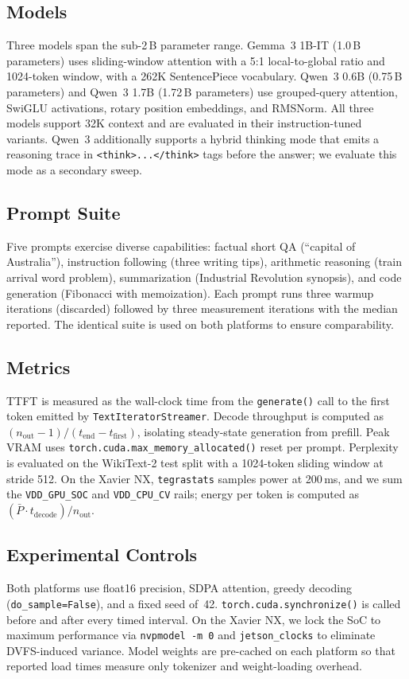 \documentclass[conference]{IEEEtran}
\begin{document}
\subsection{Models}
Three models span the sub-2\,B parameter range. Gemma~3 1B-IT (1.0\,B parameters) uses sliding-window attention with a 5:1 local-to-global ratio and 1024-token window, with a 262K SentencePiece vocabulary. Qwen~3 0.6B (0.75\,B parameters) and Qwen~3 1.7B (1.72\,B parameters) use grouped-query attention, SwiGLU activations, rotary position embeddings, and RMSNorm. All three models support 32K context and are evaluated in their instruction-tuned variants. Qwen~3 additionally supports a hybrid thinking mode that emits a reasoning trace in \texttt{<think>...</think>} tags before the answer; we evaluate this mode as a secondary sweep.

\subsection{Prompt Suite}
Five prompts exercise diverse capabilities: factual short QA (``capital of Australia''), instruction following (three writing tips), arithmetic reasoning (train arrival word problem), summarization (Industrial Revolution synopsis), and code generation (Fibonacci with memoization). Each prompt runs three warmup iterations (discarded) followed by three measurement iterations with the median reported. The identical suite is used on both platforms to ensure comparability.

\subsection{Metrics}
TTFT is measured as the wall-clock time from the \texttt{generate()} call to the first token emitted by \texttt{TextIteratorStreamer}. Decode throughput is computed as $(n_{\text{out}}-1)/(t_{\text{end}}-t_{\text{first}})$, isolating steady-state generation from prefill. Peak VRAM uses \texttt{torch.cuda.max\_memory\_allocated()} reset per prompt. Perplexity is evaluated on the WikiText-2 test split \cite{wikitext} with a 1024-token sliding window at stride 512. On the Xavier NX, \texttt{tegrastats} samples power at 200\,ms, and we sum the \texttt{VDD\_GPU\_SOC} and \texttt{VDD\_CPU\_CV} rails; energy per token is computed as $(\bar{P} \cdot t_{\text{decode}})/n_{\text{out}}$.

\subsection{Experimental Controls}
Both platforms use float16 precision, SDPA attention, greedy decoding (\texttt{do\_sample=False}), and a fixed seed of~42. \texttt{torch.cuda.synchronize()} is called before and after every timed interval. On the Xavier NX, we lock the SoC to maximum performance via \texttt{nvpmodel -m 0} and \texttt{jetson\_clocks} to eliminate DVFS-induced variance. Model weights are pre-cached on each platform so that reported load times measure only tokenizer and weight-loading overhead.
\end{document}
